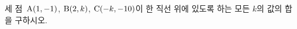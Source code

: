 세 점~$\mathrm{A}(1{,}\mkern3mu\mathopen{}-1)$, $\mathrm{B}(2{,}\mkern3mu\mathopen{}k)$, $\mathrm{C}(-k{,}\mkern3mu\mathopen{}-10)$이 한 직선 위에 있도록 하는 모든 $k$의 값의 합을 구하시오.
